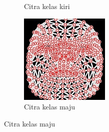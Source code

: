 \begin{figure}[H]
\begin{subfigure}{0.3\textwidth}
      \caption{Citra kelas kiri}
      \label{fig:image2}
  \end{subfigure}
  \hfill
  \begin{subfigure}{0.3\textwidth}
      \centering
      \includegraphics[width=\linewidth]{gambar/50 maju.jpg}
      \caption{Citra kelas maju}
      \label{fig:image3}
  \end{subfigure}
  

\end{figure}
